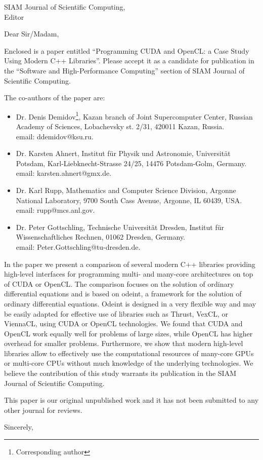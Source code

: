 \documentclass{letter}
\begin{document}
\begin{letter}{SIAM Journal of Scientific Computing,\\Editor}
\opening{Dear Sir/Madam,}

Enclosed is a paper entitled ``Programming CUDA and OpenCL: a Case Study Using
Modern C++ Libraries''. Please accept it as a candidate for publication in the
``Software and High-Performance Computing'' section of SIAM Journal of
Scientific Computing.

The co-authors of the paper are:
\begin{itemize}
    \item Dr. Denis Demidov\footnote{Corresponding author}, Kazan branch of
	Joint Supercomputer Center, Russian Academy of Sciences, Lobachevsky
	st. 2/31, 420011 Kazan, Russia.\\
	email: ddemidov@ksu.ru.
    \item Dr. Karsten Ahnert, Institut f\"ur Physik und Astronomie,
	Universit\"at Potsdam, Karl-Liebknecht-Strasse 24/25, 14476
	Potsdam-Golm, Germany.\\ email: karsten.ahnert@gmx.de.
    \item Dr. Karl Rupp, Mathematics and Computer Science Division, Argonne
	National Laboratory, 9700 South Cass Avenue, Argonne, IL 60439, USA. \\
	email: rupp@mcs.anl.gov.
    \item Dr. Peter Gottschling, Technische Universit\"at Dresden, Institut
	f\"ur Wissenschaftliches Rechnen, 01062 Dresden, Germany.\\
	email: Peter.Gottschling@tu-dresden.de.
\end{itemize}

In the paper we present a comparison of several modern C++ libraries providing
high-level interfaces for programming multi- and many-core architectures on top
of CUDA or OpenCL.  The comparison focuses on the solution of ordinary
differential equations and is based on odeint, a framework for the solution of
ordinary differential equations. Odeint is designed in a very flexible way and
may be easily adapted for effective use of libraries such as Thrust, VexCL, or
ViennaCL, using CUDA or OpenCL technologies.  We found that CUDA and OpenCL
work equally well for problems of large sizes, while OpenCL has higher overhead
for smaller problems.  Furthermore, we show that modern high-level libraries
allow to effectively use the computational resources of many-core GPUs or
multi-core CPUs without much knowledge of the underlying technologies. We
believe the contribution of this study warrants its publication in the SIAM
Journal of Scientific Computing.

This paper is our original unpublished work and it has not been submitted to
any other journal for reviews.

\closing{Sincerely,}

\end{letter}
\end{document}

